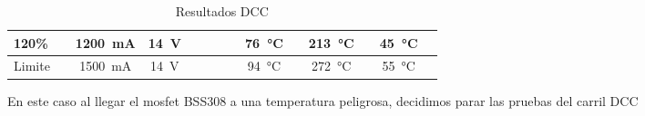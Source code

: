 \begin{landscape}
\begin{table}[H]
\begin{tabular}{|l|c|c|c|c|c|c|c|c|c|c|c|c|c|}
            120\%                                   &                                & \SI{1200}{\milli\ampere}       & \SI{14}{\volt}                 &                          &            &           &       & \SI{76}{\celsius} &            & \SI{213}{\celsius} &            & \SI{45}{\celsius} &            \\ \hline
            Limite                                  &                                & \SI{1500}{\milli\ampere}                               & \SI{14}{\volt}                 &  &            &           &       & \SI{94}{\celsius} &            & \SI{272}{\celsius} &            & \SI{55}{\celsius} &            \\
            \hline
        \end{tabular}

        \caption{Resultados DCC}
        \label{tab:ResTablas DCC}
    \end{table}
En este caso al llegar el mosfet BSS308 a una temperatura peligrosa, decidimos parar las pruebas del carril DCC
\end{landscape}